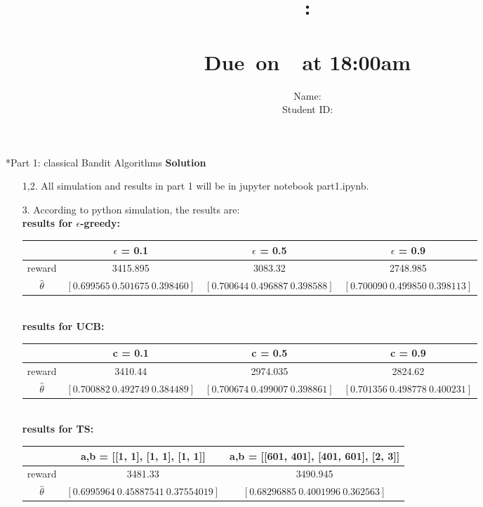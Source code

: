 \documentclass{article}
\title{
    \vspace{2in}
    \textmd{\textbf{\hmwkClass:\\  \hmwkTitle}}\\
    \normalsize\vspace{0.1in}\small{Due\ on\ \hmwkDueDate\ at 18:00am}\\
   \vspace{2in}
}
\author{
	Name: \textbf{\hmwkAuthorName} \\
	Student ID: \hmwkAuthorID}
\date{}
\newcommand{\solution}{\textbf{\Large Solution}}
\begin{document}
\maketitle
\pagebreak

\begin{homeworkProblem}*{Part 1: classical Bandit Algorithms}
    \solution
    \begin{enumerate}
        \item[1,2.]
        All simulation and results in part 1 will be in jupyter notebook part1.ipynb.
        \item[3.]
        According to python simulation, the results are:\\
        \textbf{results for $\epsilon$-greedy:}\\
        \begin{tabular}[t]{|c|c|c|c|}
        \hline
         & $\epsilon$ = 0.1 & $\epsilon$ = 0.5 & $\epsilon$ = 0.9 \\
        \hline
        reward & 3415.895 & 3083.32 & 2748.985 \\
        \hline
        $\hat{\theta}$ & $[0.699565\ 0.501675\ 0.398460]$ & $[0.700644\ 0.496887\ 0.398588]$ & $[0.700090\ 0.499850\ 0.398113]$ \\
        \hline
        \end{tabular}\\

        \textbf{results for UCB:}\\
        \begin{tabular}[t]{|c|c|c|c|}
        \hline
         & c = 0.1 & c = 0.5 & c = 0.9 \\
        \hline
        reward & 3410.44 & 2974.035 & 2824.62 \\
        \hline
        $\hat{\theta}$ & $[0.700882\ 0.492749\ 0.384489]$ & $[0.700674\ 0.499007\ 0.398861]$ & $[0.701356\ 0.498778\ 0.400231]$ \\
        \hline
        \end{tabular}\\

        \textbf{results for TS:}\\
        \begin{tabular}[t]{|c|c|c|}
        \hline
         & a,b = [[1, 1], [1, 1], [1, 1]] & a,b = [[601, 401], [401, 601], [2, 3]]\\
        \hline
        reward & 3481.33 & 3490.945 \\
        \hline
        $\hat{\theta}$ & $[0.6995964\ 0.45887541\ 0.37554019]$ & $[0.68296885\ 0.4001996\ 0.362563]$ \\
        \hline
        \end{tabular}\\


\end{enumerate}
\end{homeworkProblem}
\end{document}
